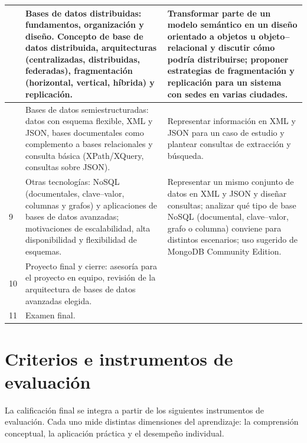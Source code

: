 \documentclass[12pt]{article}
\begin{document}
\begin{longtable}{|>{\centering\arraybackslash}p{1.2cm}|p{7.2cm}|p{7.2cm}|}
	7 &
	Bases de datos distribuidas: fundamentos, organización y diseño. Concepto de base de datos distribuida, arquitecturas (centralizadas, distribuidas, federadas), fragmentación (horizontal, vertical, híbrida) y replicación. &
	Transformar parte de un modelo semántico en un diseño orientado a objetos u objeto–relacional y discutir cómo podría distribuirse; proponer estrategias de fragmentación y replicación para un sistema con sedes en varias ciudades. \\
	\hline
	
	8 &
	Bases de datos semiestructuradas: datos con esquema flexible, XML y JSON, bases documentales como complemento a bases relacionales y consulta básica (XPath/XQuery, consultas sobre JSON). &
	Representar información en XML y JSON para un caso de estudio y plantear consultas de extracción y búsqueda. \\
	\hline
	
	9 &
	Otras tecnologías: NoSQL (documentales, clave–valor, columnas y grafos) y aplicaciones de bases de datos avanzadas; motivaciones de escalabilidad, alta disponibilidad y flexibilidad de esquemas. &
	Representar un mismo conjunto de datos en XML y JSON y diseñar consultas; analizar qué tipo de base NoSQL (documental, clave–valor, grafo o columna) conviene para distintos escenarios; uso sugerido de MongoDB Community Edition. \\
	\hline
	
	10 &
	Proyecto final y cierre: asesoría para el proyecto en equipo, revisión de la arquitectura de bases de datos avanzadas elegida. & \\
	\hline
	
	11 &
	Examen final. & \\
	\hline
	
\end{longtable}

	
	\section*{Criterios e instrumentos de evaluación}
	
	La calificación final se integra a partir de los siguientes instrumentos de evaluación. Cada uno mide distintas dimensiones del aprendizaje: la comprensión conceptual, la aplicación práctica y el desempeño individual.
	
\end{document}
